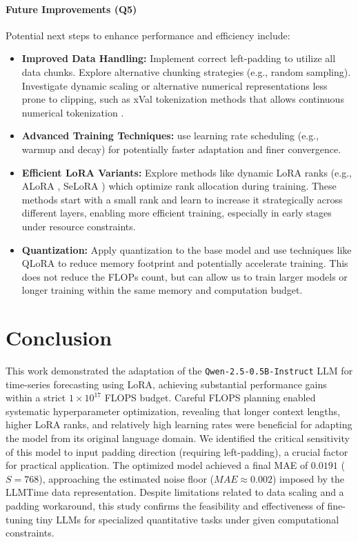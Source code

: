 \documentclass{article}
\begin{document}
\paragraph{Future Improvements (Q5)}
Potential next steps to enhance performance and efficiency include:
\begin{itemize}
    \item \textbf{Improved Data Handling:} Implement correct left-padding to utilize all data chunks. Explore alternative chunking strategies (e.g., random sampling). Investigate dynamic scaling or alternative numerical representations less prone to clipping, such as xVal tokenization methods that allows continuous numerical tokenization
 \cite{golkar2024xvalcontinuousnumericaltokenization}.
    \item \textbf{Advanced Training Techniques:} use learning rate scheduling (e.g., warmup and decay) for potentially faster adaptation and finer convergence.
    \item \textbf{Efficient LoRA Variants:} Explore methods like dynamic LoRA ranks (e.g., ALoRA \cite{liu2024aloraallocatinglowrankadaptation}, SeLoRA \cite{mao2024seloraselfexpandinglowrankadaptation}) which optimize rank allocation during training. These methods start with a small rank and learn to increase it strategically across different layers, enabling more efficient training, especially in early stages under resource constraints.
    \item \textbf{Quantization:} Apply quantization to the base model and use techniques like QLoRA \cite{dettmers2023qloraefficientfinetuningquantized} to reduce memory footprint and potentially accelerate training. This does not reduce the FLOPs count, but can allow us to train larger models or longer training within the same memory and computation budget.
\end{itemize}

\section{Conclusion}
\label{sec:conclusion}
This work demonstrated the adaptation of the \texttt{Qwen-2.5-0.5B-Instruct} LLM for time-series forecasting using LoRA, achieving substantial performance gains within a strict $1 \times 10^{17}$ FLOPS budget. Careful FLOPS planning enabled systematic hyperparameter optimization, revealing that longer context lengths, higher LoRA ranks, and relatively high learning rates were beneficial for adapting the model from its original language domain. We identified the critical sensitivity of this model to input padding direction (requiring left-padding), a crucial factor for practical application. The optimized model achieved a final MAE of $0.0191$ ($S=768$), approaching the estimated noise floor ($MAE \approx 0.002$) imposed by the LLMTime data representation. Despite limitations related to data scaling and a padding workaround, this study confirms the feasibility and effectiveness of fine-tuning tiny LLMs for specialized quantitative tasks under given computational constraints.
\end{document}
